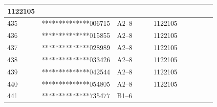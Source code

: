 \documentclass[UTF8,10pt,a4paper,fontset=fandol]{ctexart}
\newcommand{\fieldvalue}[1]{#1}
\begin{document}
\begin{center}
\begin{tabular}{|p{0.07\linewidth}|p{0.24\linewidth}|p{0.20\linewidth}|p{0.18\linewidth}|p{0.16\linewidth}|}
\fieldvalue{1122105} & \\
\hline
\fieldvalue{435} &
\fieldvalue{**************006715} &
\fieldvalue{A2--8} &
\fieldvalue{1122105} & \\
\hline
\fieldvalue{436} &
\fieldvalue{**************015855} &
\fieldvalue{A2--8} &
\fieldvalue{1122105} & \\
\hline
\fieldvalue{437} &
\fieldvalue{**************028989} &
\fieldvalue{A2--8} &
\fieldvalue{1122105} & \\
\hline
\fieldvalue{438} &
\fieldvalue{**************033426} &
\fieldvalue{A2--8} &
\fieldvalue{1122105} & \\
\hline
\fieldvalue{439} &
\fieldvalue{**************042544} &
\fieldvalue{A2--8} &
\fieldvalue{1122105} & \\
\hline
\fieldvalue{440} &
\fieldvalue{**************054805} &
\fieldvalue{A2--8} &
\fieldvalue{1122105} & \\
\hline
\fieldvalue{441} &
\fieldvalue{**************735477} &
\fieldvalue{B1--6} &

\end{tabular}
\end{center}
\end{document}
